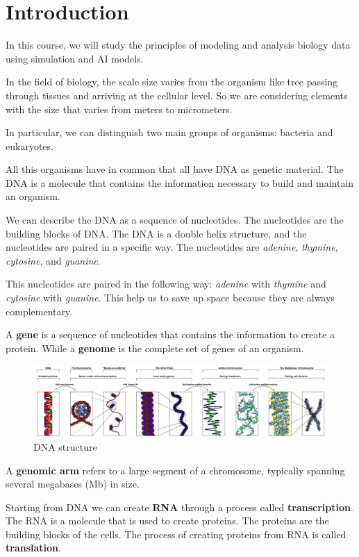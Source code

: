 \chapter{Introduction}
In this course, we will study the principles of modeling and analysis biology
data using simulation and AI models.

In the field of biology, the scale size varies from the organism like tree passing
through tissues and arriving at the cellular level. So we are considering elements
with the size that varies from meters to micrometers.

In particular, we can distinguish two main groups of organisms: bacteria and eukaryotes.

All this organisms have in common that all have DNA as genetic material. The DNA is
a molecule that contains the information necessary to build and maintain an organism.

We can describe the DNA as a sequence of nucleotides. The nucleotides are the building
blocks of DNA. The DNA is a double helix structure, and the nucleotides are paired in
a specific way. The nucleotides are \textit{adenine}, \textit{thymine}, \textit{cytosine},
and \textit{guanine}.

This nucleotides are paired in the following way: \textit{adenine} with \textit{thymine}
and \textit{cytosine} with \textit{guanine}. This help us to save up space because
they are always complementary.

A \textbf{gene} is a sequence of nucleotides that contains the information to 
create a protein. While a \textbf{genome} is the complete set of genes of an organism.

\begin{figure}[!ht]
    \centering
    \includegraphics[width=\textwidth]{img/DNA.png}
    \caption{DNA structure}
    \label{fig:dna}
\end{figure}

A \textbf{genomic arm} refers to a large segment of a chromosome, typically 
spanning several megabases (Mb) in size.

Starting from DNA we can create \textbf{RNA} through a process called \textbf{transcription}.
The RNA is a molecule that is used to create proteins. The proteins are the building blocks
of the cells. The process of creating proteins from RNA is called \textbf{translation}.